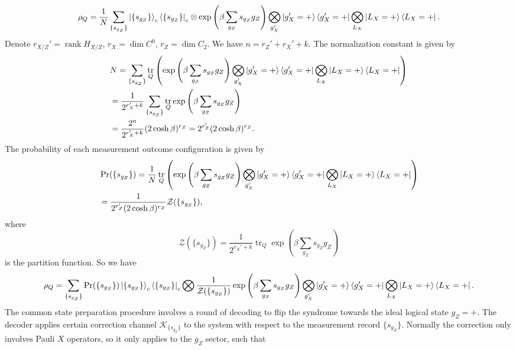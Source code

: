 \documentclass[twoside,english,aps,showpacs,pra,superscriptaddress]{revtex4-2}
\DeclareMathOperator{\rank}{rank}
\DeclareMathOperator{\tr}{tr}
\begin{document}
\begin{equation}
    \rho_Q = \frac{1}{N}\sum_{\{s_{g_Z} \} } \ket{\{s_{g_Z}\}}_c\bra{\{s_{g_Z}\}}_c \otimes \exp\left(\beta \sum_{g_Z} s_{g_Z} g_Z\right) \bigotimes_{g_X'} \ket{g_X'=+} \bra{g_X'=+} \bigotimes_{L_X} \ket{L_X=+}\bra{L_X=+}.
\end{equation}
Denote $r_{X/Z}' = \rank H_{X/Z}$, $r_{X} = \dim C^0$, $r_Z = \dim C_2$. We have $n= r_Z'+r_X'+k$.
The normalization constant is given by
\begin{equation}
\begin{aligned}
    &N = \sum_{\{s_{g_Z} \} } \tr_Q \left(  \exp\left(\beta \sum_{g_Z} s_{g_Z} g_Z\right) \bigotimes_{g_X'} \ket{g_X'=+} \bra{g_X'=+} \bigotimes_{L_X} \ket{L_X=+}\bra{L_X=+}\right) \\
    & = \frac{1}{2^{r_X'+k}}\sum_{\{s_{g_Z} \} } \tr_Q \exp\left(\beta \sum_{g_Z} s_{g_Z} g_Z\right) \\
    & = \frac{2^n}{2^{r_X'+k}} (2\cosh\beta)^{r_Z} = 2^{r_Z'} (2\cosh\beta)^{r_Z}.
\end{aligned}
\end{equation}
The probability of each measurement outcome configuration is given by 
\begin{equation}
\begin{aligned}
    & \Pr(\{s_{g_Z}\}) =  \frac{1}{N} \tr_Q \left(  \exp\left(\beta \sum_{g_Z} s_{g_Z} g_Z\right) \bigotimes_{g_X'} \ket{g_X'=+} \bra{g_X'=+} \bigotimes_{L_X} \ket{L_X=+}\bra{L_X=+}\right)\\
    & = \frac{1}{2^{r_Z'} (2\cosh\beta)^{r_Z}} \mathcal{Z}(\{s_{g_Z}\}), 
\end{aligned}
\end{equation}
where
\begin{equation}
    \mathcal{Z}(\{s_{g_Z}\}) = \frac{1}{2^{r_X'+k}}\tr_Q \exp\left(\beta \sum_{g_Z} s_{g_Z} g_Z\right) 
\end{equation}
is the partition function. So we have
\begin{equation}
    \rho_Q = \sum_{\{s_{g_Z} \} } \Pr(\{s_{g_Z}\}) \ket{\{s_{g_Z}\}}_c\bra{\{s_{g_Z}\}}_c \bigotimes \frac{1}{\mathcal{Z}(\{s_{g_Z}\})}\exp\left(\beta \sum_{g_Z} s_{g_Z} g_Z\right) \bigotimes_{g_X'} \ket{g_X'=+} \bra{g_X'=+} \bigotimes_{L_X} \ket{L_X=+}\bra{L_X=+}.
\end{equation}
The common state preparation procedure involves a round of decoding to flip the syndrome towards the ideal logical state $g_Z=+$. The decoder applies certain correction channel $\mathcal{K}_{\{s_{g_Z}\}}$ to the system with respect to the measurement record $\{s_{g_Z}\}$. Normally the correction only involves Pauli $X$ operators, so it only applies to the $g_Z$ sector, such that  
\end{document}
